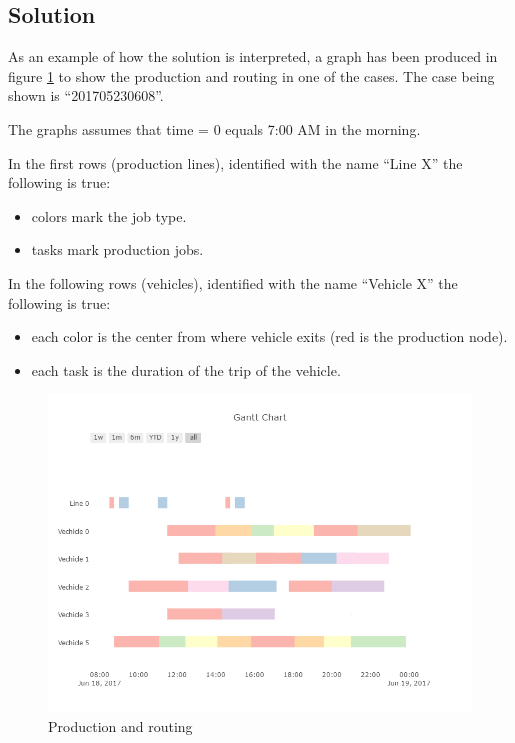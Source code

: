 \subsection{Solution}

As an example of how the solution is interpreted, a graph has been produced in figure \ref{fig:solution} to show the production and routing in one of the cases. The case being shown is "`201705230608"'.

The graphs assumes that time = 0 equals 7:00 AM in the morning.

In the first rows (production lines), identified with the name "`Line X"' the following is true:

\begin{itemize}
	\item colors mark the job type.
	\item tasks mark production jobs.
\end{itemize}

In the following rows (vehicles), identified with the name "`Vehicle X"' the following is true:

\begin{itemize}
	\item each color is the center from where vehicle exits (red is the production node).
	\item each task is the duration of the trip of the vehicle.
\end{itemize}

\begin{figure}
	\centering
		\includegraphics[width=\textwidth]{imagenes/production_and_routes.png}
	\caption{Production and routing}
	\label{fig:solution}
\end{figure}
